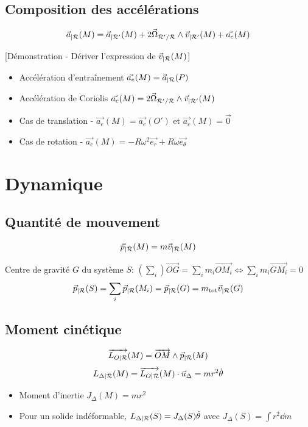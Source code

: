 \documentclass[openany]{book}
\begin{document}
\subsection{Composition des accélérations}
\[ \vec{a}_{|\mathcal{R}}(M) = \vec{a}_{|\mathcal{R} '}(M) + 2 \vec{\Omega}_{\mathcal{R}' / \mathcal{R}}\wedge \vec{v}_{|\mathcal{R} '} (M) + \vec{a_e}(M) \]

[Démonstration - Dériver l'expression de $\vec{v}_{|\mathcal{R}} (M)$]

\begin{itemize}
    \item Accélération d'entraînement $\vec{a_e} (M) = \vec{a}_{|\mathcal{R}}(P)$
    \item Accélération de Coriolis $\vec{a_c}(M) = 2 \vec{\Omega}_{\mathcal{R}' / \mathcal{R}}\wedge \vec{v}_{|\mathcal{R} '} (M)$
    \item Cas de translation - $\vec{a_e}(M) = \vec{a_e}(O')$ et $\vec{a_c}(M) = \vec{0}$
    \item Cas de rotation - $\vec{a_e}(M) = -R \omega^2 \vec{e_r} + R \dot{\omega} \vec{e_{\theta}}$
\end{itemize}

\section{Dynamique}
\subsection{Quantité de mouvement}
\[ \vec{p}_{|\mathcal{R}}(M) = m \vec{v}_{|\mathcal{R}}(M) \]

Centre de gravité $G$ du système $S$: $ (\sum_i) \overrightarrow{OG} = \sum_i m_i \overrightarrow{OM_i} \iff \sum_i m_i \overrightarrow{GM_i} = 0 $
\[ \vec{p}_{|\mathcal{R}}(S) = \sum_i \vec{p}_{|\mathcal{R}}(M_i) = \vec{p}_{|\mathcal{R}}(G) = m_{\text{tot}} \vec{v}_{|\mathcal{R}}(G) \]

\subsection{Moment cinétique}
\[ \overrightarrow{L_{O|\mathcal{R}}}(M) = \overrightarrow{OM} \wedge \vec{p}_{|\mathcal{R}}(M) \]
\[ L_{\Delta |\mathcal{R}}(M) = \overrightarrow{L_{O|\mathcal{R}}}(M) \cdot \vec{u}_{\Delta} = mr^2\dot{\theta} \]

\begin{itemize}
    \item Moment d'inertie $J_{\Delta}(M) = mr^2$
    \item Pour un solide indéformable, $ L_{\Delta |\mathcal{R}}(S) = J_{\Delta}(S) \dot{\theta} $ avec $ J_{\Delta}(S) = \int r^2 \dd m $
\end{itemize}
\end{document}
